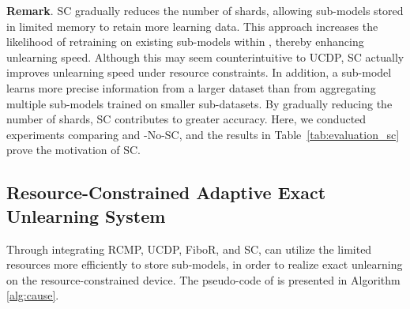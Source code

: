 \documentclass[conference,compsoc]{IEEEtran}
\begin{document}
\begin{table}[ht]
\caption{SC Performance Comparison}
\label{tab:evaluation_sc}
\vspace{-1 em}
\end{table}

\textbf{Remark}. SC gradually reduces the number of shards, allowing sub-models stored in limited memory to retain more learning data. This approach increases the likelihood of retraining on existing sub-models within \tool, thereby enhancing unlearning speed. Although this may seem counterintuitive to UCDP, SC actually improves unlearning speed under resource constraints. In addition, a sub-model learns more precise information from a larger dataset than from aggregating multiple sub-models trained on smaller sub-datasets. By gradually reducing the number of shards, SC contributes to greater accuracy. Here, we conducted experiments comparing \tool and \tool-No-SC, and the results in Table~\ref{tab:evaluation_sc} prove the motivation of SC.


\subsection{Resource-Constrained Adaptive Exact Unlearning System}
\label{subsec:cause}

Through integrating RCMP, UCDP, FiboR, and SC, \tool can utilize the limited resources more efficiently to store sub-models, in order to realize exact unlearning on the resource-constrained device. The pseudo-code of \tool is presented in Algorithm \ref{alg:cause}.
\end{document}
